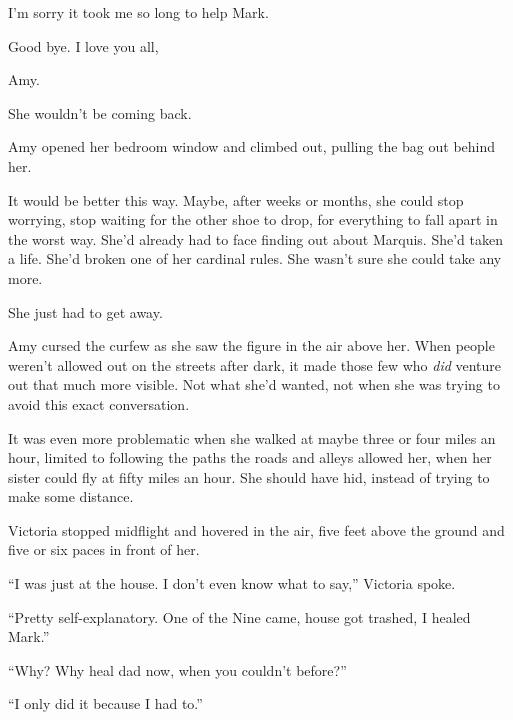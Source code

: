 I'm sorry it took me so long to help Mark.



Good bye.  I love you all,



Amy.



She wouldn't be coming back.



Amy opened her bedroom window and climbed out, pulling the bag out behind her.



It would be better this way.  Maybe, after weeks or months, she could stop worrying, stop waiting for the other shoe to drop, for everything to fall apart in the worst way.  She'd already had to face finding out about Marquis.  She'd taken a life.  She'd broken one of her cardinal rules.  She wasn't sure she could take any more.



She just had to get away.



\blacksquare



Amy cursed the curfew as she saw the figure in the air above her.  When people weren't allowed out on the streets after dark, it made those few who \emph{did} venture out that much more visible.  Not what she'd wanted, not when she was trying to avoid this exact conversation.



It was even more problematic when she walked at maybe three or four miles an hour, limited to following the paths the roads and alleys allowed her, when her sister could fly at fifty miles an hour.  She should have hid, instead of trying to make some distance.



Victoria stopped midflight and hovered in the air, five feet above the ground and five or six paces in front of her.



``I was just at the house.  I don't even know what to say,'' Victoria spoke.



``Pretty self-explanatory.  One of the Nine came, house got trashed, I healed Mark.''



``Why?  Why heal dad now, when you couldn't before?''



``I only did it because I had to.''



